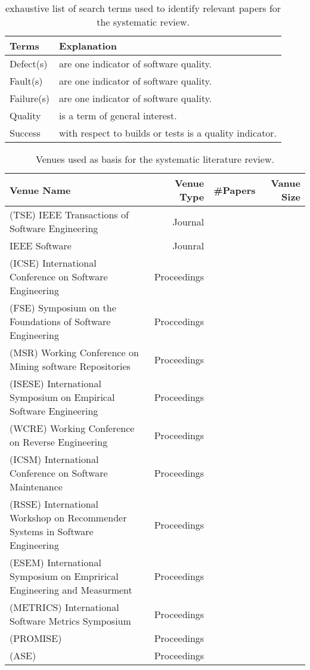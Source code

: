 \begin{table}
\centering
\begin{tabular}{ll}
\toprule
Terms & Explanation\\
\midrule
Defect(s) & are one indicator of software quality.\\
Fault(s) &are one indicator of software quality.\\
Failure(s) &are one indicator of software quality.\\
Quality & is a term of general interest.\\
Success & with respect to builds or tests is a quality indicator.\\
\bottomrule
\end{tabular}
\caption{exhaustive list of search terms used to identify relevant papers for the systematic review.}
\label{chap:6:tab:terms}
\end{table}

\begin{table}[t]
\centering
\begin{tabular}{lrrr}
\toprule
Venue Name & Venue Type & \#Papers & Vanue Size\\
\midrule
(TSE) IEEE Transactions of Software Engineering & Journal &\\
IEEE Software & Jounral & \\
(ICSE) International Conference on Software Engineering & Proceedings & \\
(FSE) Symposium on the Foundations of Software Engineering & Proccedings & \\
(MSR) Working Conference on Mining software Repositories & Proceedings & \\
(ISESE) International Symposium on Empirical Software Engineering & Proceedings & \\
(WCRE) Working Conference on Reverse Engineering & Proceedings & \\
(ICSM) International Conference on Software Maintenance & Proceedings & \\
(RSSE) International Workshop on Recommender Systems in Software Engineering & Proceedings & \\
(ESEM) International Symposium on Emprirical Engineering and Measurment & Proceedings & \\
(METRICS) International Software Metrics Symposium & Proceedings & \\
(PROMISE) & Proceedings & \\
(ASE) & Proceedings & \\
\bottomrule
\end{tabular}
\caption{Venues used as basis for the systematic literature review.}
\label{chap:6:tab:venues}
\end{table}

